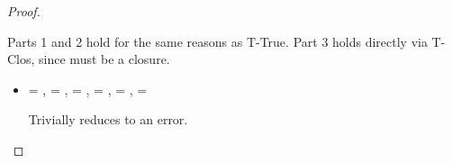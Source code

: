 \begin{lemma}
\begin{proof}
\begin{case}[B-Abs]
\begin{itemize}
\begin{subcase}[T-Abs]
        Parts 1 and 2 hold for the same reasons as T-True.
        Part 3 holds directly via T-Clos, since \val{} must be a closure.
      \end{subcase}
  \end{itemize}
\end{case}

\begin{case}[BE-Error]
        \opsem {\openv{}} {\e{}} {}


  \begin{itemize}
    \item[]
      \begin{subcase}[T-Error] 
  \ep{} = ,
  \e{} = ,
  \ty{} = \Bot,
  \thenprop{\prop{}} = \botprop{}, \elseprop{\prop{}} = \botprop{}, \object{} = \emptyobject{}

        Trivially reduces to an error.
      \end{subcase}
  \end{itemize}
\end{case}

\end{proof}

\end{lemma}

{}

{}
